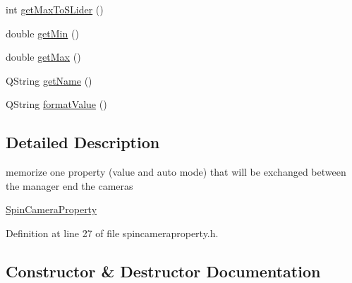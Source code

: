\begin{DoxyCompactItemize}
\item 
int \mbox{\hyperlink{class_camera_manager_spin_1_1_spin_camera_property_abc6c87f936566293bcb0c8535aec2f0d}{get\+Max\+To\+S\+Lider}} ()
\item 
double \mbox{\hyperlink{class_camera_manager_spin_1_1_spin_camera_property_a22774e095a9628a0948e438afd48e6e4}{get\+Min}} ()
\item 
double \mbox{\hyperlink{class_camera_manager_spin_1_1_spin_camera_property_a28e89c1d0bcb77c3439142a0766f87ab}{get\+Max}} ()
\item 
Q\+String \mbox{\hyperlink{class_camera_manager_spin_1_1_spin_camera_property_aacaa4011b97b0d623b307a0b881bd945}{get\+Name}} ()
\item 
Q\+String \mbox{\hyperlink{class_camera_manager_spin_1_1_spin_camera_property_a2034f93f6c6bb58b8deacf2ae79dda22}{format\+Value}} ()
\end{DoxyCompactItemize}


\subsection{Detailed Description}
memorize one property (value and auto mode) that will be exchanged between the manager end the cameras 

\mbox{\hyperlink{class_camera_manager_spin_1_1_spin_camera_property}{Spin\+Camera\+Property}} 

Definition at line 27 of file spincameraproperty.\+h.



\subsection{Constructor \& Destructor Documentation}
\mbox{\label{class_camera_manager_spin_1_1_spin_camera_property_a46d9125c8eb6dce1ac771d5804790381}} 
